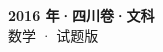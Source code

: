\documentclass[zihao=-4, a4paper]{ctexart}
\begin{document}
\begin{center}
  {\Large\bfseries 2016 年·四川卷·文科}\\[4pt]
  {\large 数学 · 试题版}
\end{center}
\medskip
{}

\end{document}
